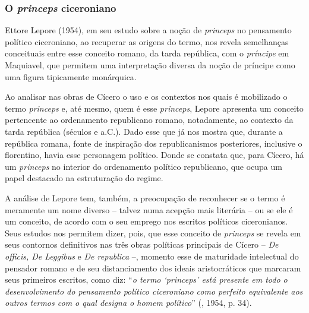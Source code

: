 \subsubsection{O \emph{princeps} ciceroniano}

Ettore Lepore (1954), em seu estudo sobre a noção de \emph{princeps} no
pensamento político ciceroniano, ao recuperar as origens do termo, nos
revela semelhanças conceituais entre esse conceito romano, da tarda
república, com o \emph{príncipe} em Maquiavel, que permitem uma
interpretação diversa da noção de príncipe como uma figura tipicamente
monárquica.

Ao analisar nas obras de Cícero o uso e os contextos nos quais é
mobilizado o termo \emph{princeps} e, até mesmo, quem é esse
\emph{princeps}, Lepore apresenta um conceito pertencente ao ordenamento
republicano romano, notadamente, ao contexto da tarda república (séculos
 e  a.C.). Dado esse que já nos mostra que, durante a república
romana, fonte de inspiração dos republicanismos posteriores, inclusive o
florentino, havia esse personagem político. Donde se constata que, para
Cícero, há um \emph{princeps} no interior do ordenamento político
republicano, que ocupa um papel destacado na estruturação do regime.

A análise de Lepore tem, também, a preocupação de reconhecer se o termo
é meramente um nome diverso -- talvez numa acepção mais literária -- ou
se ele é um conceito, de acordo com o seu emprego nos escritos políticos
ciceronianos. Seus estudos nos permitem dizer, pois, que esse conceito
de \emph{princeps} se revela em seus contornos definitivos nas três
obras políticas principais de Cícero -- \emph{De officis, De Leggibus} e
\emph{De republica} --, momento esse de maturidade intelectual do
pensador romano e de seu distanciamento dos ideais aristocráticos que
marcaram seus primeiros escritos, como diz: ``\emph{o termo `princeps'
está presente em todo o desenvolvimento do pensamento político
ciceroniano como perfeito equivalente aos outros termos com o qual
designa o homem político}'' (, 1954, p. 34).

